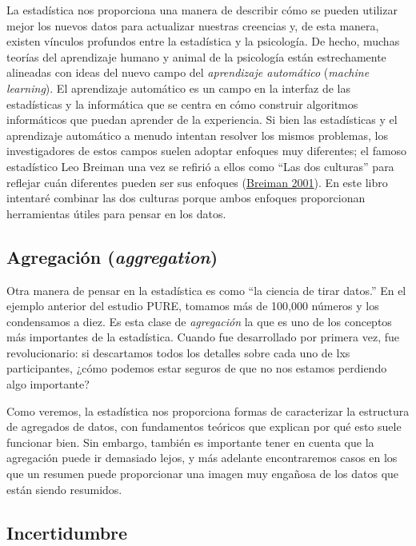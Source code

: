 \documentclass[
  12pt,
]{book}
\begin{document}
La estadística nos proporciona una manera de describir cómo se pueden utilizar mejor los nuevos datos para actualizar nuestras creencias y, de esta manera, existen vínculos profundos entre la estadística y la psicología. De hecho, muchas teorías del aprendizaje humano y animal de la psicología están estrechamente alineadas con ideas del nuevo campo del \emph{aprendizaje automático} (\emph{machine learning}). El aprendizaje automático es un campo en la interfaz de las estadísticas y la informática que se centra en cómo construir algoritmos informáticos que puedan aprender de la experiencia. Si bien las estadísticas y el aprendizaje automático a menudo intentan resolver los mismos problemas, los investigadores de estos campos suelen adoptar enfoques muy diferentes; el famoso estadístico Leo Breiman una vez se refirió a ellos como ``Las dos culturas'' para reflejar cuán diferentes pueden ser sus enfoques (\protect\hyperlink{ref-breiman2001}{Breiman 2001}). En este libro intentaré combinar las dos culturas porque ambos enfoques proporcionan herramientas útiles para pensar en los datos.

\hypertarget{agregaciuxf3n-aggregation}{%
\subsection{\texorpdfstring{Agregación (\emph{aggregation})}{Agregación (aggregation)}}\label{agregaciuxf3n-aggregation}}

Otra manera de pensar en la estadística es como ``la ciencia de tirar datos.'' En el ejemplo anterior del estudio PURE, tomamos más de 100,000 números y los condensamos a diez. Es esta clase de \emph{agregación} la que es uno de los conceptos más importantes de la estadística. Cuando fue desarrollado por primera vez, fue revolucionario: si descartamos todos los detalles sobre cada uno de lxs participantes, ¿cómo podemos estar seguros de que no nos estamos perdiendo algo importante?

Como veremos, la estadística nos proporciona formas de caracterizar la estructura de agregados de datos, con fundamentos teóricos que explican por qué esto suele funcionar bien. Sin embargo, también es importante tener en cuenta que la agregación puede ir demasiado lejos, y más adelante encontraremos casos en los que un resumen puede proporcionar una imagen muy engañosa de los datos que están siendo resumidos.

\hypertarget{incertidumbre}{%
\subsection{Incertidumbre}\label{incertidumbre}}
\end{document}
